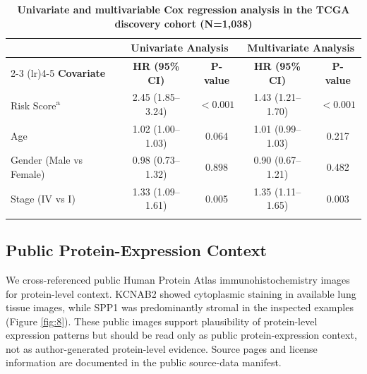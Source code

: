 \documentclass[pdflatex,sn-mathphys-num,referee,lineno]{sn-jnl}
\theoremstyle{thmstyleone}%
\theoremstyle{thmstyletwo}%
\theoremstyle{thmstylethree}%
\begin{document}
\begin{table}[htbp]
    \caption{\textbf{Univariate and multivariable Cox regression analysis in the TCGA discovery cohort (N=1,038)}}\label{tab:cox_regression}
    \begin{tabular*}{\textwidth}{@{\extracolsep\fill}lcccc}
        \toprule
        & \multicolumn{2}{c}{\textbf{Univariate Analysis}} & \multicolumn{2}{c}{\textbf{Multivariate Analysis}} \\
        \cmidrule(lr){2-3} \cmidrule(lr){4-5}
        \textbf{Covariate} & \textbf{HR (95\% CI)} & \textbf{P-value} & \textbf{HR (95\% CI)} & \textbf{P-value} \\
        \midrule
        Risk Score\textsuperscript{a} & 2.45 (1.85--3.24) & $<0.001$ & 1.43 (1.21--1.70) & $<0.001$ \\
        Age & 1.02 (1.00--1.03) & 0.064 & 1.01 (0.99--1.03) & 0.217 \\
        Gender (Male vs Female) & 0.98 (0.73--1.32) & 0.898 & 0.90 (0.67--1.21) & 0.482 \\
        Stage (IV vs I) & 1.33 (1.09--1.61) & 0.005 & 1.35 (1.11--1.65) & 0.003 \\
        \botrule
    \end{tabular*}
\end{table}

\subsection{Public Protein-Expression Context}
We cross-referenced public Human Protein Atlas immunohistochemistry images for protein-level context. KCNAB2 showed cytoplasmic staining in available lung tissue images, while SPP1 was predominantly stromal in the inspected examples (Figure \ref{fig:8}). These public images support plausibility of protein-level expression patterns but should be read only as public protein-expression context, not as author-generated protein-level evidence. Source pages and license information are documented in the public source-data manifest.
\end{document}
